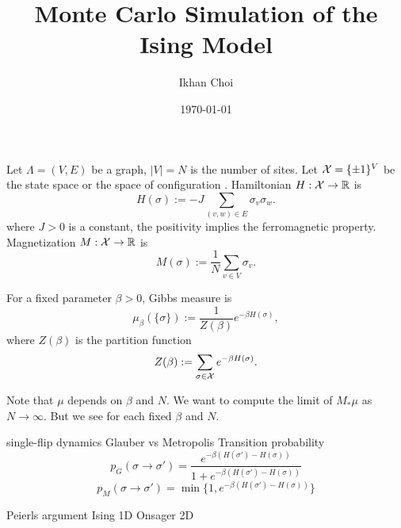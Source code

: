 \documentclass[11pt]{article}
\title{Monte Carlo Simulation of the Ising Model}
\author{Ikhan Choi}
\date{\today}
\begin{document}
\maketitle


\section{}

Let $\Lambda=(V,E)$ be a graph, $|V|=N$ is the number of sites.
Let $\mathcal{X}=\{\pm1\}^V$ be the state space or the space of configuration .
Hamiltonian $H:\mathcal{X}\to\mathbb{R}$ is
\[H(\sigma):=-J\sum_{(v,w)\in E}\sigma_v\sigma_w.\]
where $J>0$ is a constant, the positivity implies the ferromagnetic property.
Magnetization $M:\mathcal{X}\to\mathbb{R}$ is
\[M(\sigma):=\frac1N\sum_{v\in V}\sigma_v.\]

For a fixed parameter $\beta>0$,
Gibbs measure is
\[\mu_\beta(\{\sigma\}):=\frac1{Z(\beta)}e^{-\beta H(\sigma)},\]
where $Z(\beta)$ is the partition function
\[Z(\beta):=\sum_{\sigma\in\mathcal{X}}e^{-\beta H(\sigma)}.\]


Note that $\mu$ depends on $\beta$ and $N$.
We want to compute the limit of $M_*\mu$ as $N\to\infty$.
But we see for each fixed $\beta$ and $N$.


single-flip dynamics
Glauber vs Metropolis
Transition probability
\[p_G(\sigma\to\sigma')=\frac{e^{-\beta(H(\sigma')-H(\sigma))}}{1+e^{-\beta(H(\sigma')-H(\sigma))}}\]
\[p_M(\sigma\to\sigma')=\min\{1,e^{-\beta(H(\sigma')-H(\sigma))}\}\]


Peierls argument
Ising 1D
Onsager 2D
\end{document}
